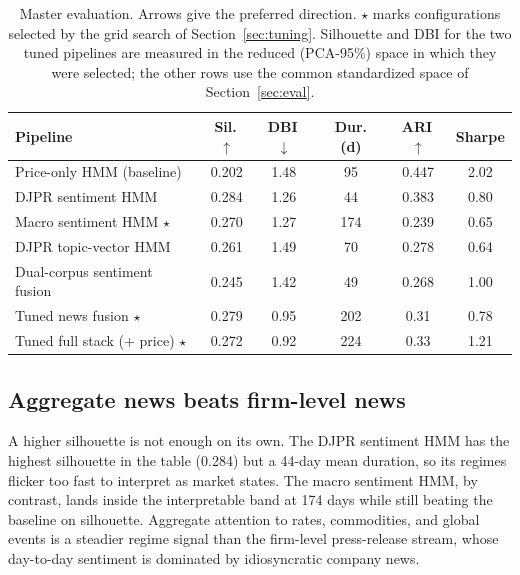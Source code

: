 \documentclass{article} %
\begin{document}
\begin{table}[t]
\caption{Master evaluation. Arrows give the preferred direction.
$\star$ marks configurations selected by the grid search of
Section~\ref{sec:tuning}. Silhouette and DBI for the two tuned pipelines are
measured in the reduced (PCA-95\%) space in which they were selected; the other
rows use the common standardized space of Section~\ref{sec:eval}.}
\label{tab:master}
\begin{center}
\begin{tabular}{lccccc}
\toprule
\textbf{Pipeline} & \textbf{Sil.}\,$\uparrow$ & \textbf{DBI}\,$\downarrow$ & \textbf{Dur. (d)} & \textbf{ARI}\,$\uparrow$ & \textbf{Sharpe} \\
\midrule
Price-only HMM (baseline)        & 0.202 & 1.48 & \phantom{0}95 & 0.447 & 2.02 \\
DJPR sentiment HMM               & 0.284 & 1.26 & \phantom{0}44 & 0.383 & 0.80 \\
Macro sentiment HMM $\star$      & 0.270 & 1.27 & 174 & 0.239 & 0.65 \\
DJPR topic-vector HMM            & 0.261 & 1.49 & \phantom{0}70 & 0.278 & 0.64 \\
Dual-corpus sentiment fusion     & 0.245 & 1.42 & \phantom{0}49 & 0.268 & 1.00 \\
Tuned news fusion $\star$        & 0.279 & 0.95 & 202 & 0.31\phantom{0} & 0.78 \\
Tuned full stack (+ price) $\star$ & 0.272 & 0.92 & 224 & 0.33\phantom{0} & 1.21 \\
\bottomrule
\end{tabular}
\end{center}
\end{table}

\subsection{Aggregate news beats firm-level news}
A higher silhouette is not enough on its own. The DJPR sentiment HMM has the
highest silhouette in the table (0.284) but a 44-day mean duration, so its
regimes flicker too fast to interpret as market states. The macro sentiment
HMM, by contrast, lands inside the interpretable band at 174 days while still
beating the baseline on silhouette. Aggregate attention to rates, commodities,
and global events is a steadier regime signal than the firm-level press-release
stream, whose day-to-day sentiment is dominated by idiosyncratic company news.
\end{document}
